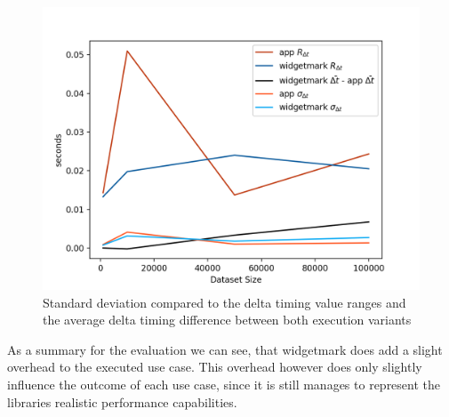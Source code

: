 \begin{figure}[h]
    \centering
    \includegraphics[width=12cm]{resources/img/evaluation/Eval_STD}
    \caption{Standard deviation compared to the delta timing value ranges and
        the average delta timing difference between both execution variants}
    \label{fig:evaluation:std}
\end{figure}

As a summary for the evaluation we can see, that widgetmark does add a slight
overhead to the executed use case. This overhead however does only slightly
influence the outcome of each use case, since it is still manages to represent
the libraries realistic performance capabilities.
